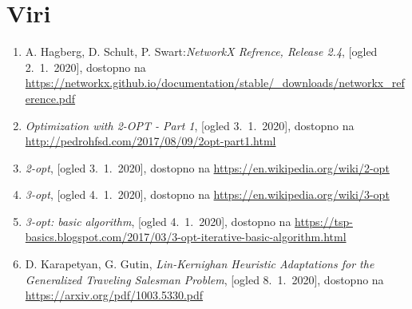 \documentclass[8pt]{beamer}
\begin{document}
\section[Viri]{Viri}
\begin{frame}
\begin{enumerate}

\item A. Hagberg, D. Schult, P. Swart:\emph{NetworkX Refrence, Release 2.4}, [ogled 2.~1.~2020], dostopno na \url{https://networkx.github.io/documentation/stable/_downloads/networkx_reference.pdf}

\item \emph{Optimization with 2-OPT - Part 1}, [ogled 3.~1.~2020], dostopno na \url{http://pedrohfsd.com/2017/08/09/2opt-part1.html}

\item \emph{2-opt}, [ogled 3.~1.~2020], dostopno na \url{https://en.wikipedia.org/wiki/2-opt}

\item \emph{3-opt}, [ogled 4.~1.~2020], dostopno na \url{https://en.wikipedia.org/wiki/3-opt}

\item \emph{3-opt: basic algorithm}, [ogled 4.~1.~2020], dostopno na \url{https://tsp-basics.blogspot.com/2017/03/3-opt-iterative-basic-algorithm.html}

\item D. Karapetyan, G. Gutin, \emph{Lin-Kernighan Heuristic Adaptations for the Generalized Traveling Salesman Problem}, [ogled  8.~1.~2020], dostopno na \url{https://arxiv.org/pdf/1003.5330.pdf}
\end{enumerate}
\end{frame}
\end{document}
